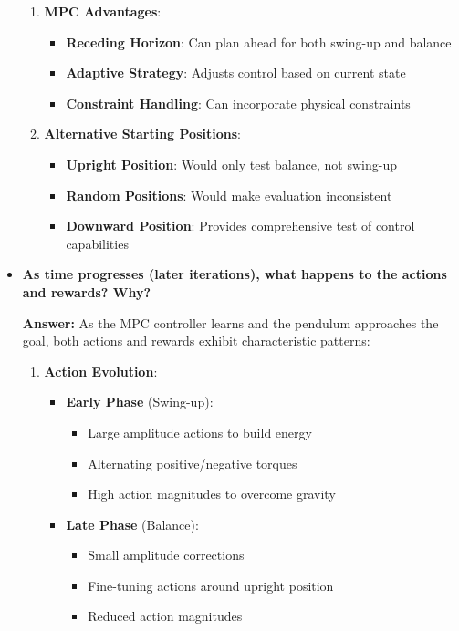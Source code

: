 \begin{itemize}
\begin{enumerate}
        \item \textbf{MPC Advantages}:
        \begin{itemize}
            \item \textbf{Receding Horizon}: Can plan ahead for both swing-up and balance
            \item \textbf{Adaptive Strategy}: Adjusts control based on current state
            \item \textbf{Constraint Handling}: Can incorporate physical constraints
        \end{itemize}
        
        \item \textbf{Alternative Starting Positions}:
        \begin{itemize}
            \item \textbf{Upright Position}: Would only test balance, not swing-up
            \item \textbf{Random Positions}: Would make evaluation inconsistent
            \item \textbf{Downward Position}: Provides comprehensive test of control capabilities
        \end{itemize}
    \end{enumerate}
    
    \item \textbf{As time progresses (later iterations), what happens to the actions and rewards? Why?}
    
    \textbf{Answer:} As the MPC controller learns and the pendulum approaches the goal, both actions and rewards exhibit characteristic patterns:
    
    \begin{enumerate}
        \item \textbf{Action Evolution}:
        \begin{itemize}
            \item \textbf{Early Phase} (Swing-up):
            \begin{itemize}
                \item Large amplitude actions to build energy
                \item Alternating positive/negative torques
                \item High action magnitudes to overcome gravity
            \end{itemize}
            
            \item \textbf{Late Phase} (Balance):
            \begin{itemize}
                \item Small amplitude corrections
                \item Fine-tuning actions around upright position
                \item Reduced action magnitudes
            \end{itemize}
        \end{itemize}
        

\end{enumerate}
\end{itemize}
